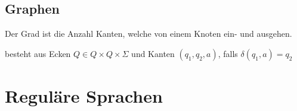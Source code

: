\documentclass[a4paper]{article}
\begin{document}
\subsection{Graphen}
	\begin{multicols}{2}
	
	\begin{fdef}
	Der Grad ist die Anzahl Kanten, welche von einem Knoten ein- und ausgehen.
	\end{fdef}
	
	\begin{fdef}
	besteht aus Ecken $Q \in Q \times Q \times \Sigma$ und Kanten $(q_1,q_2, a)$, falls $\delta(q_1, a) = q_2$
	\end{fdef}

	\end{multicols}


\newpage
\section{Reguläre Sprachen}
\end{document}
